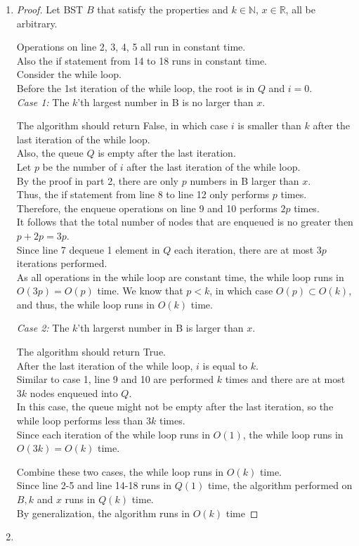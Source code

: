 \documentclass[10pt]{article}
\begin{document}
\begin{enumerate}
\item %
\begin{proof}
Let BST $B$ that satisfy the properties and $k \in \mathbb{N}$, $x \in \mathbb{R}$, all be arbitrary. 

Operations on line 2, 3, 4, 5 all run in constant time. \\
Also the if statement from 14 to 18 runs in constant time. \\

Consider the while loop. \\
Before the 1st iteration of the while loop, the root is in $Q$ and $i = 0$. \\

\textit{Case 1:} The $k$'th largest number in B is no larger than $x$. 
\begin{addmargin}[1em]{0em}
	The algorithm should return False, in which case $i$ is smaller than $k$ after the last iteration of the while loop. \\
	Also, the queue $Q$ is empty after the last iteration. \\
	Let $p$ be the number of $i$ after the last iteration of the while loop. \\
	By the proof in part 2, there are only $p$ numbers in B larger than $x$. \\
	Thus, the if statement from line 8 to line 12 only performs $p$ times. \\
	Therefore, the enqueue operations on line 9 and 10 performs $2p$ times. \\
	It follows that the total number of nodes that are enqueued is no greater then $p+2p = 3p$. \\
	Since line 7 dequeue 1 element in $Q$ each iteration, there are at most $3p$ iterations performed. \\
	As all operations in the while loop are constant time, the while loop runs in $O(3p) = O(p)$ time.
	We know that $p < k$, in which case $O(p) \subset O(k)$, and thus, the while loop runs in $O(k)$ time.
\end{addmargin}
\textit{Case 2:} The $k$'th largerst number in B is larger than $x$. 
\begin{addmargin}[1em]{0em}
	The algorithm should return True. \\
	After the last iteration of the while loop, $i$ is equal to $k$. \\
	Similar to case 1, line 9 and 10 are performed $k$ times and there are at most $3k$ nodes enqueued into $Q$. \\
	In this case, the queue might not be empty after the last iteration, so the while loop performs less than $3k$ times. \\
	Since each iteration of the while loop runs in $O(1)$, the while loop runs in $O(3k) = O(k)$ time.
\end{addmargin}
Combine these two cases, the while loop runs in $O(k)$ time. \\
Since line 2-5 and line 14-18 runs in $Q(1)$ time, the algorithm performed on $B, k$ and $x$ runs in $Q(k)$ time. \\
By generalization, the algorithm runs in $O(k)$ time
\end{proof}

\item %

\end{enumerate}
\end{document}
